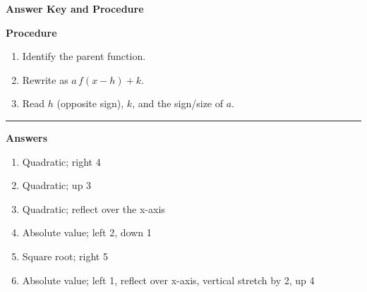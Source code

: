 \documentclass[12pt]{article}
\begin{document}
\begin{center}{\Large \textbf{Answer Key and Procedure}}\end{center}
\vspace{0.3cm}
\textbf{Procedure}
\begin{enumerate}
  \item Identify the parent function.
  \item Rewrite as $a\,f(x-h)+k$.
  \item Read $h$ (opposite sign), $k$, and the sign/size of $a$.
\end{enumerate}
\vspace{0.4cm}\hrule\vspace{0.4cm}
\textbf{Answers}
\begin{enumerate}[label=\textbf{\arabic*.}]
  \item Quadratic; right 4
  \item Quadratic; up 3
  \item Quadratic; reflect over the x-axis
  \item Absolute value; left 2, down 1
  \item Square root; right 5
  \item Absolute value; left 1, reflect over x-axis, vertical stretch by 2, up 4
\end{enumerate}
\end{document}
